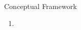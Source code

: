 \begin{block}{Conceptual Framework}
    
    \begin{enumerate}
        \item
    \end{enumerate}
\end{block}
